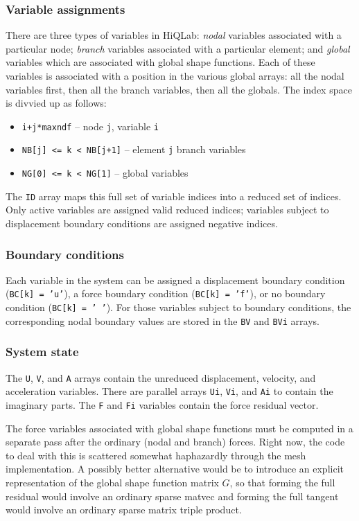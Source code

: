 \subsubsection{Variable assignments}

There are three types of variables in HiQLab: {\em nodal} variables
associated with a particular node; {\em branch} variables
associated with a particular element; and {\em global} variables
which are associated with global shape functions.  Each of these
variables is associated with a position in the various global
arrays: all the nodal variables first, then all the branch
variables, then all the globals.  The index space is divvied up as
follows:
\begin{itemize}
\item {\tt i+j*maxndf}           -- node {\tt j}, variable {\tt i}
\item {\tt NB[j] <= k < NB[j+1]} -- element {\tt j} branch variables
\item {\tt NG[0] <= k < NG[1]}   -- global variables
\end{itemize}

The {\tt ID} array maps this full set of variable indices into a
reduced set of indices.  Only active variables are assigned valid
reduced indices; variables subject to displacement boundary
conditions are assigned negative indices.


\subsubsection{Boundary conditions}

Each variable in the system can be assigned a displacement boundary
condition ({\tt BC[k] = 'u'}), a force boundary condition 
({\tt BC[k] = 'f'}), or no boundary condition ({\tt BC[k] = ' '}).  For
those variables subject to boundary conditions, the corresponding
nodal boundary values are stored in the {\tt BV} and {\tt BVi} arrays.


\subsubsection{System state}

The {\tt U}, {\tt V}, and {\tt A} arrays contain the unreduced
displacement, velocity, and acceleration variables.  There are
parallel arrays {\tt Ui}, {\tt Vi}, and {\tt Ai} to contain the
imaginary parts.  The {\tt F} and {\tt Fi} variables contain the
force residual vector.

The force variables associated with global shape functions must be
computed in a separate pass after the ordinary (nodal and branch)
forces.  Right now, the code to deal with this is scattered
somewhat haphazardly through the mesh implementation.  A possibly
better alternative would be to introduce an explicit representation
of the global shape function matrix $G$, so that forming the full
residual would involve an ordinary sparse matvec and forming the
full tangent would involve an ordinary sparse matrix triple
product.



